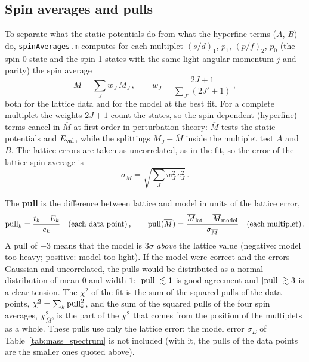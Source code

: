 \documentclass[11pt, a4paper]{article}
\begin{document}
\subsection{Spin averages and pulls}
\label{sec:spin_avg}
To separate what the static potentials do from what the hyperfine terms ($A$, $B$) do, \texttt{spinAverages.m} computes for each multiplet $(s/d)_1$, $p_1$, $(p/f)_2$, $p_0$ (the spin-0 state and the spin-1 states with the same light angular momentum $j$ and parity) the spin average
\begin{equation}
    \overline{M} = \sum_J w_J\, M_J \, , \qquad w_J = \frac{2J+1}{\sum_{J'}(2J'+1)} \, ,
\end{equation}
both for the lattice data and for the model at the best fit. For a complete multiplet the weights $2J+1$ count the states, so the spin-dependent (hyperfine) terms cancel in $\overline{M}$ at first order in perturbation theory: $\overline{M}$ tests the static potentials and $E_{\rm val}$, while the splittings $M_J-\overline{M}$ inside the multiplet test $A$ and $B$. The lattice errors are taken as uncorrelated, as in the fit, so the error of the lattice spin average is
\begin{equation}
    \sigma_{\overline{M}} = \sqrt{\sum_J w_J^2\, e_J^2} \, .
\end{equation}

The \textbf{pull} is the difference between lattice and model in units of the lattice error,
\begin{equation}
    {\rm pull}_k = \frac{t_k - E_k}{e_k} \quad \text{(each data point)} \, , \qquad
    {\rm pull}(\overline{M}) = \frac{\overline{M}_{\rm lat} - \overline{M}_{\rm model}}{\sigma_{\overline{M}}} \quad \text{(each multiplet)} \, .
\end{equation}
A pull of $-3$ means that the model is $3\sigma$ \emph{above} the lattice value (negative: model too heavy; positive: model too light). If the model were correct and the errors Gaussian and uncorrelated, the pulls would be distributed as a normal distribution of mean $0$ and width $1$: $|{\rm pull}|\lesssim1$ is good agreement and $|{\rm pull}|\gtrsim3$ is a clear tension. The $\chi^2$ of the fit is the sum of the squared pulls of the data points, $\chi^2=\sum_k {\rm pull}_k^2$, and the sum of the squared pulls of the four spin averages, $\chi^2_{\overline{M}}$, is the part of the $\chi^2$ that comes from the position of the multiplets as a whole. These pulls use only the lattice error: the model error $\sigma_E$ of Table~\ref{tab:mass_spectrum} is not included (with it, the pulls of the data points are the smaller ones quoted above).
\end{document}
